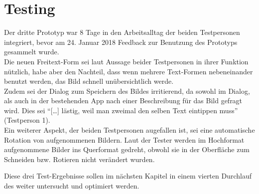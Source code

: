 \section{Testing}\label{sec:test3}
Der dritte Prototyp war 8 Tage in den Arbeitsalltag der beiden Testpersonen integriert, bevor am 24. Januar 2018 Feedback zur Benutzung des Prototyps gesammelt wurde. \\

Die neuen Freitext-Form sei laut Aussage beider Testpersonen in ihrer Funktion nützlich, habe aber den Nachteil, dass wenn mehrere Text-Formen nebeneinander benutzt werden, das Bild schnell unübersichtlich werde. \\

Zudem sei der Dialog zum Speichern des Bildes irritierend, da sowohl im Dialog, als auch in der bestehenden App nach einer Beschreibung für das Bild gefragt wird.
Dies sei ``[\dots] lästig, weil man zweimal den selben Text eintippen muss'' (Testperson 1). \\

Ein weiterer Aspekt, der beiden Testpersonen augefallen ist, sei eine automatische Rotation von aufgenommenen Bildern.
Laut der Tester werden im Hochformat aufgenommene Bilder ins Querformat gedreht, obwohl sie in der Oberfläche zum Schneiden bzw. Rotieren nicht verändert wurden.

Diese drei Test-Ergebnisse sollen im nächsten Kapitel in einem vierten Durchlauf des \hcdp{} weiter untersucht und optimiert werden.
